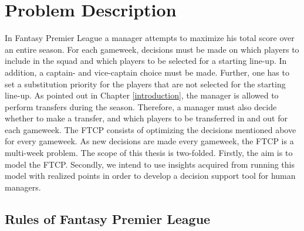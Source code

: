 
\chapter{Problem Description}
In Fantasy Premier League a manager attempts to maximize his total score over an entire season. For each gameweek, decisions must be made on which players to include in the squad and which players to be selected for a starting line-up. In addition, a captain- and vice-captain choice must be made. Further, one has to set a substitution priority for the players that are not selected for the starting line-up. As pointed out in Chapter \ref{introduction}, the manager is allowed to perform transfers during the season. Therefore, a manager must also decide whether to make a transfer, and which players to be transferred in and out for each gameweek.
\newpar
The FTCP consists of optimizing the decisions mentioned above for every gameweek. As new decisions are made every gameweek, the FTCP is a multi-week problem. The scope of this thesis is two-folded. Firstly, the aim is to model the FTCP. Secondly, we intend to use insights acquired from running this model with realized points in order to develop a decision support tool for human managers. 

\section{Rules of Fantasy Premier League} \label{rules of fpl}

